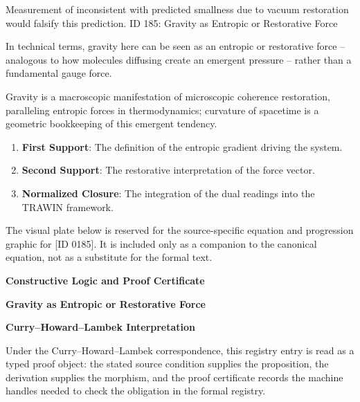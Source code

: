 Measurement of inconsistent with predicted smallness due to vacuum restoration would falsify this prediction. ID 185: Gravity as Entropic or Restorative Force  

In technical terms, gravity here can be seen as an entropic or restorative force -- analogous to how molecules diffusing create an emergent pressure -- rather than a fundamental gauge force.

Gravity is a macroscopic manifestation of microscopic coherence restoration, paralleling entropic forces in thermodynamics; curvature of spacetime is a geometric bookkeeping of this emergent tendency.  
\endgroup

\begin{enumerate}[leftmargin=1.6em,itemsep=6pt,topsep=4pt]
\item \textbf{First Support}: The definition of the entropic gradient driving the system.
\item \textbf{Second Support}: The restorative interpretation of the force vector.
\item \textbf{Normalized Closure}: The integration of the dual readings into the TRAWIN framework.
\end{enumerate}

\begingroup\footnotesize\sloppy
The visual plate below is reserved for the source-specific equation and progression graphic for [ID 0185]. It is included only as a companion to the canonical equation, not as a substitute for the formal text.
\par\endgroup
\ifTZPDarkEdition
{}
\fi

\clearpage
\begingroup\tzpsupportsetup
\noindent\textbf{\fontsize{10.8pt}{12.8pt}\selectfont [ID 0185] Constructive Logic and Proof Certificate}\par
\noindent\textbf{\fontsize{10pt}{12pt}\selectfont Gravity as Entropic or Restorative Force}\par
\vspace{0.45em}
\begingroup
\footnotesize
\setlength{\parskip}{0.22em}
\setlength{\parindent}{0pt}
\noindent\textbf{Curry--Howard--Lambek Interpretation}\par
Under the Curry--Howard--Lambek correspondence, this registry entry is read as a typed proof
object: the stated source condition supplies the proposition, the derivation supplies the
morphism, and the proof certificate records the machine handles needed to check the obligation
in the formal registry.

